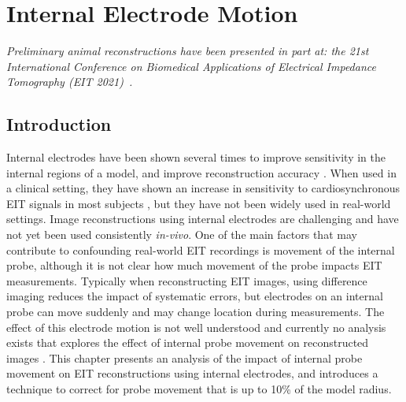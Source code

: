 \chapter{Internal Electrode Motion}
\label{chap:chapter-7}

\emph{Preliminary animal reconstructions have
 been presented in part at: 
 the 21st International Conference on Biomedical 
 Applications of Electrical Impedance Tomography (EIT 2021)~\parencite{stowe_using_2021}.} 

\section{Introduction}
Internal electrodes have been shown several times to improve sensitivity in the internal regions 
of a model, and improve reconstruction accuracy
\parencite{nasehi_tehrani_modelling_2012,nasehi_tehrani_evaluation_2012,nguyen_electrical_2020,pilkington_utilization_1989,schuessler_utility_1995}.
When used in a clinical setting, they have shown an increase in sensitivity to cardiosynchronous
EIT signals in most subjects \parencite{czaplik_application_2014}, but they have not been widely used 
in real-world settings. 
Image reconstructions using internal electrodes are challenging and have not yet 
been used consistently \emph{in-vivo}.
One of the main factors that may contribute to confounding real-world EIT recordings is movement 
of the internal probe, although 
it is not clear how much movement of the probe impacts EIT measurements.
Typically when reconstructing EIT images, using difference imaging reduces the impact of 
systematic errors, but electrodes on an internal probe can move suddenly and may change location 
during measurements. 
The effect of this electrode motion is not well understood and currently no analysis exists 
that explores the effect of internal probe movement on reconstructed images 
\parencite{nguyen_review_2012}. 
This chapter presents an analysis of the impact of internal probe movement on 
EIT reconstructions using internal electrodes, and introduces a technique to correct for probe 
movement that is up to 10\% of the model radius.

